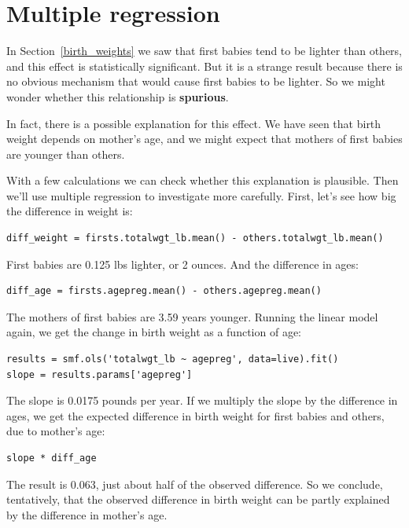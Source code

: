 \documentclass[12pt]{book}
\theoremstyle{exercise}
\begin{document}
\section{Multiple regression}%
\label{multiple}

In Section~\ref{birth_weights} we saw that first babies tend to be
lighter than others, and this effect is statistically significant.
But it is a strange result because there is no obvious mechanism that
would cause first babies to be lighter.  So we might wonder whether
this relationship is {\bf spurious}.%
%

In fact, there is a possible explanation for this effect.  We have
seen that birth weight depends on mother's age, and we might expect
that mothers of first babies are younger than others.%
%

With a few calculations we can check whether this explanation
is plausible.  Then we'll use multiple regression to investigate
more carefully.  First, let's see how big the difference in weight
is:

\begin{verbatim}
diff_weight = firsts.totalwgt_lb.mean() - others.totalwgt_lb.mean()
\end{verbatim}

First babies are 0.125 lbs lighter, or 2 ounces.  And the difference
in ages:

\begin{verbatim}
diff_age = firsts.agepreg.mean() - others.agepreg.mean()
\end{verbatim}

The mothers of first babies are 3.59 years younger.  Running the
linear model again, we get the change in birth weight as a function
of age:%
%

\begin{verbatim}
results = smf.ols('totalwgt_lb ~ agepreg', data=live).fit()
slope = results.params['agepreg']
\end{verbatim}

The slope is 0.0175 pounds per year.  If we multiply the slope by
the difference in ages, we get the expected difference in birth
weight for first babies and others, due to mother's age:

\begin{verbatim}
slope * diff_age
\end{verbatim}

The result is 0.063, just about half of the observed difference.
So we conclude, tentatively, that the observed difference in birth
weight can be partly explained by the difference in mother's age. 
\end{document}
